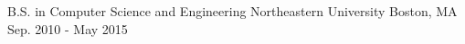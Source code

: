 
\begin{cventries}
	\cventry
	    {B.S. in Computer Science and Engineering} %
	    {Northeastern University} %
	    {Boston, MA} %
	    {Sep. 2010 - May 2015} %
	    {} %
\end{cventries}

